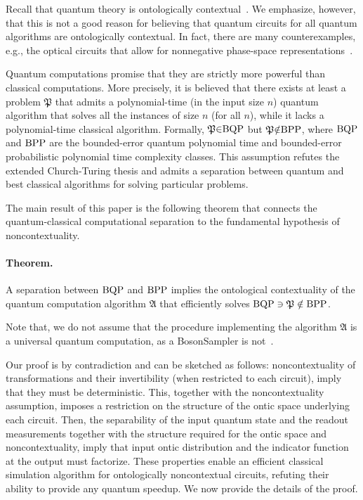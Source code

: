\documentclass[prl,twocolumn,amsmath,amssymb,nofootinbib]{revtex4-1}
\newcommand{\prob}{\mathfrak{P}}
\newcommand{\alg}{\mathfrak{A}}
\begin{document}
Recall that quantum theory is ontologically contextual~\cite{KS,Spekkens2008,Ferrie2008}.
We emphasize, however, that this is not a good reason for believing that quantum circuits for all quantum algorithms are ontologically contextual.
In fact, there are many counterexamples, e.g., the optical circuits that allow for nonnegative phase-space representations~\cite{Bartlett2002,Rahimi-Keshari2018}.

Quantum computations promise that they are strictly more powerful than classical computations.
More precisely, it is believed that there exists at least a problem $\prob$ that admits a polynomial-time (in the input size $n$) quantum algorithm that solves all the instances of size $n$ (for all $n$), while it lacks a polynomial-time classical algorithm.
Formally, $\prob{\in}{\rm BQP}$ but $\prob{\notin}{\rm BPP}$, where ${\rm BQP}$ and ${\rm BPP}$ are the bounded-error quantum polynomial time and bounded-error probabilistic polynomial time complexity classes.
This assumption refutes the extended Church-Turing thesis and admits a separation between quantum and best classical algorithms for solving particular problems.

The main result of this paper is the following theorem that connects the quantum-classical computational separation to the fundamental hypothesis of noncontextuality.

%
\paragraph*{\textbf{Theorem.} }
A separation between $\rm BQP$ and $\rm BPP$ implies the ontological contextuality of the quantum computation algorithm $\alg$ that efficiently solves ${\rm BQP}\ni\prob\notin{\rm BPP}$.
%

Note that, we do not assume that the procedure implementing the algorithm $\alg$ is a universal quantum computation, as a BosonSampler is not~\cite{Aaronson2013}.

Our proof is by contradiction and can be sketched as follows: noncontextuality of transformations and their invertibility (when restricted to each circuit), imply that they must be deterministic.
This, together with the noncontextuality assumption, imposes a restriction on the structure of the ontic space underlying each circuit.
Then, the separability of the input quantum state and the readout measurements together with the structure required for the ontic space and noncontextuality, imply that input ontic distribution and the indicator function at the output must factorize.
These properties enable an efficient classical simulation algorithm for ontologically noncontextual circuits, refuting their ability to provide any quantum speedup.
We now provide the details of the proof.
\end{document}

